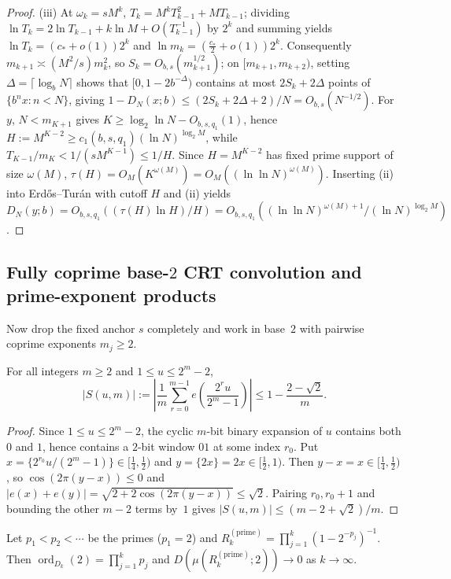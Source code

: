 \documentclass[11pt]{article}
\newcommand{\fr}[1]{\{#1\}}
\DeclareMathOperator{\ord}{ord}
\begin{document}
\begin{proof}
(iii) At $\omega_k=sM^k$, $T_k=M^k T_{k-1}^2+M T_{k-1}$; dividing $\ln T_k=2\ln T_{k-1}+k\ln M+O(T_{k-1}^{-1})$ by $2^k$ and summing yields $\ln T_k=(c_*+o(1))2^k$ and $\ln m_k=(\frac{c_*}{2}+o(1))2^k$. Consequently $m_{k+1}\asymp (M^2/s)m_k^2$, so $S_k=O_{b,s}(m_{k+1}^{1/2})$; on $[m_{k+1},m_{k+2})$, setting $\Delta=\lceil\log_b N\rceil$ shows that $[0,1-2b^{-\Delta})$ contains at most $2S_k+2\Delta$ points of $\{b^nx:n<N\}$, giving $1-D_N(x;b)\le(2S_k+2\Delta+2)/N=O_{b,s}(N^{-1/2})$. For $y$, $N<m_{K+1}$ gives $K\ge\log_2\ln N-O_{b,s,q_1}(1)$, hence $H:=M^{K-2}\ge c_1(b,s,q_1)(\ln N)^{\log_2 M}$, while $T_{K-1}/m_K<1/(sM^{K-1})\le 1/H$. Since $H=M^{K-2}$ has fixed prime support of size $\omega(M)$, $\tau(H)=O_M(K^{\omega(M)})=O_M((\ln\ln N)^{\omega(M)})$. Inserting (ii) into Erd\H{o}s--Tur\'an with cutoff $H$ and (ii) yields $D_N(y;b)=O_{b,s,q_1}((\tau(H)\ln H)/H)=O_{b,s,q_1}((\ln\ln N)^{\omega(M)+1}/(\ln N)^{\log_2 M})$.
\end{proof}

\subsection{Fully coprime base-$2$ CRT convolution and prime-exponent products}

Now drop the fixed anchor $s$ completely and work in base~$2$ with pairwise coprime exponents $m_j\ge2$.

\begin{lemma}\label{lem:01-transition}
For all integers $m\ge2$ and $1\le u\le 2^m-2$,
\[
|S(u,m)|:=\left|\frac1m\sum_{r=0}^{m-1}e\!\left(\frac{2^r u}{2^m-1}\right)\right|\le 1-\frac{2-\sqrt2}{m}.
\]
\end{lemma}

\begin{proof}
Since $1\le u\le 2^m-2$, the cyclic $m$-bit binary expansion of $u$ contains both $0$ and $1$, hence contains a $2$-bit window $01$ at some index $r_0$. Put $x=\fr{2^{r_0}u/(2^m-1)}\in[\frac14,\frac12)$ and $y=\fr{2x}=2x\in[\frac12,1)$. Then $y-x=x\in[\frac14,\frac12)$, so $\cos(2\pi(y-x))\le0$ and $|e(x)+e(y)|=\sqrt{2+2\cos(2\pi(y-x))}\le\sqrt2$. Pairing $r_0,r_0+1$ and bounding the other $m-2$ terms by~$1$ gives $|S(u,m)|\le(m-2+\sqrt2)/m$.
\end{proof}

\begin{corollary}\label{cor:prime-product}
Let $p_1<p_2<\cdots$ be the primes ($p_1=2$) and $R_k^{(\mathrm{prime})}=\prod_{j=1}^k(1-2^{-p_j})^{-1}$. Then $\ord_{D_k}(2)=\prod_{j=1}^k p_j$ and $D(\mu(R_k^{(\mathrm{prime})};2))\to0$ as $k\to\infty$.
\end{corollary}
\end{document}
